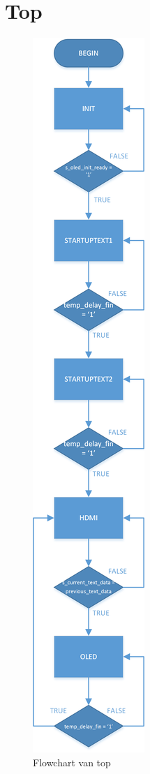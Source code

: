 \section{Top}
\label{sec:appTop}
	\begin{figure}[H]
		\centering
		\includegraphics[height=0.66\textheight]{Appendix/FlowCharts/Top}
		\caption{Flowchart van top}
		\label{fig:FlowChartTop}
	\end{figure}

